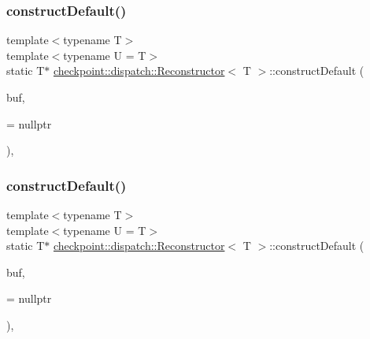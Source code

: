 \subsubsection{\texorpdfstring{construct\+Default()}{constructDefault()}\hspace{0.1cm}{\footnotesize\ttfamily [1/2]}}
{\footnotesize\ttfamily template$<$typename T$>$ \\
template$<$typename U  = T$>$ \\
static T$\ast$ \hyperlink{structcheckpoint_1_1dispatch_1_1_reconstructor}{checkpoint\+::dispatch\+::\+Reconstructor}$<$ T $>$\+::construct\+Default (\begin{DoxyParamCaption}\item[{void $\ast$}]{buf,  }\item[{\hyperlink{structcheckpoint_1_1dispatch_1_1_reconstructor_ae91135a7a24b1008e7f184271fbc35d8}{is\+Default\+Cons\+Type}$<$ U $>$ $\ast$}]{ = {\ttfamily nullptr} }\end{DoxyParamCaption})\hspace{0.3cm}{\ttfamily [inline]}, {\ttfamily [static]}}

\mbox{\label{structcheckpoint_1_1dispatch_1_1_reconstructor_a74ded346aaee98f25dc498322e6e1411}} 
\subsubsection{\texorpdfstring{construct\+Default()}{constructDefault()}\hspace{0.1cm}{\footnotesize\ttfamily [2/2]}}
{\footnotesize\ttfamily template$<$typename T$>$ \\
template$<$typename U  = T$>$ \\
static T$\ast$ \hyperlink{structcheckpoint_1_1dispatch_1_1_reconstructor}{checkpoint\+::dispatch\+::\+Reconstructor}$<$ T $>$\+::construct\+Default (\begin{DoxyParamCaption}\item[{void $\ast$}]{buf,  }\item[{\hyperlink{structcheckpoint_1_1dispatch_1_1_reconstructor_a0062e5edfdd87b34c3e5464d1f1020ec}{is\+Not\+Default\+Cons\+Type}$<$ U $>$ $\ast$}]{ = {\ttfamily nullptr} }\end{DoxyParamCaption})\hspace{0.3cm}{\ttfamily [inline]}, {\ttfamily [static]}}

